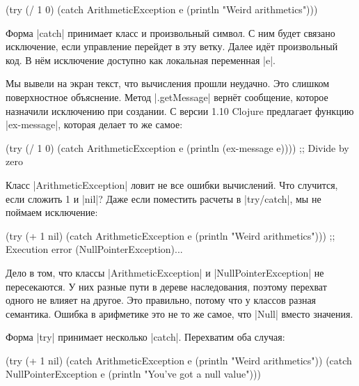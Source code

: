 \begin{english}
  \begin{clojure}
(try
  (/ 1 0)
  (catch ArithmeticException e
    (println "Weird arithmetics")))
  \end{clojure}
\end{english}

Форма \spverb|catch| принимает класс и произвольный символ. С ним будет связано
исключение, если управление перейдет в эту ветку. Далее ид\"{е}т произвольный код. В
н\"{е}м исключение доступно как локальная переменная \spverb|e|.


Мы вывели на экран текст, что вычисления прошли неудачно. Это слишком
поверхностное объяснение. Метод \spverb|.getMessage| верн\"{е}т сообщение, которое
назначили исключению при создании. С версии 1.10 Clojure предлагает функцию
\spverb|ex-message|, которая делает то же самое:

\begin{english}
  \begin{clojure}
(try
  (/ 1 0)
  (catch ArithmeticException e
    (println (ex-message e))))
;; Divide by zero
  \end{clojure}
\end{english}

Класс \spverb|ArithmeticException| ловит не все ошибки вычислений. Что случится,
если сложить 1 и \spverb|nil|? Даже если поместить расчеты в \spverb|try/catch|,
мы не поймаем исключение:

\begin{english}
  \begin{clojure}
(try
  (+ 1 nil)
  (catch ArithmeticException e
    (println "Weird arithmetics")))
;; Execution error (NullPointerException)...
  \end{clojure}
\end{english}


Дело в том, что классы \spverb|ArithmeticException| и
\spverb|NullPointerException| не пересекаются. У них разные пути в дереве
наследования, поэтому перехват одного не влияет на другое. Это правильно, потому
что у классов разная семантика. Ошибка в арифметике это не то же самое, что
\spverb|Null| вместо значения.


Форма \spverb|try| принимает несколько \spverb|catch|. Перехватим оба случая:

\begin{english}
  \begin{clojure}
(try
  (+ 1 nil)
  (catch ArithmeticException e
    (println "Weird arithmetics"))
  (catch NullPointerException e
    (println "You've got a null value")))
  \end{clojure}
\end{english}

